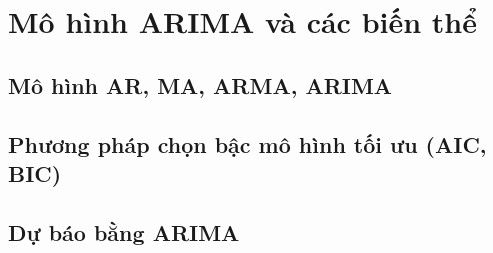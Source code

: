 \chapter{Mô hình ARIMA và các biến thể}
\section{Mô hình AR, MA, ARMA, ARIMA}
\section{Phương pháp chọn bậc mô hình tối ưu (AIC, BIC)}
\section{Dự báo bằng ARIMA}